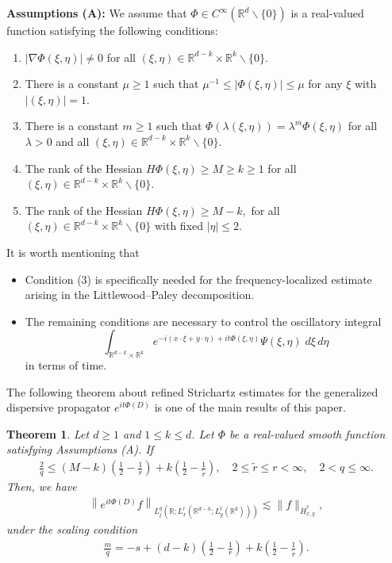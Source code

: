 \documentclass[a4paper,11pt, reqno]{amsart}
\newtheorem{theorem}{Theorem}[section]
\theoremstyle{definition}
\theoremstyle{remark}
\numberwithin{equation}{section}
\begin{document}
    \textbf{Assumptions (A):} We assume that $\Phi \in C^{\infty}\left(\mathbb{R}^{d} \backslash\{0\}\right)$ is a real-valued function satisfying the following conditions:
	\begin{enumerate}
		\item  $|\nabla \Phi(\xi, \eta)| \neq 0$ for all $(\xi, \eta) \in \mathbb{R}^{d-k} \times \mathbb{R}^{k} \backslash\{0\}$.
		\item  There is a constant $\mu \geq 1$ such that $\mu^{-1} \leq|\Phi(\xi, \eta)| \leq \mu$ for any $\xi$ with $|(\xi, \eta)|=1$.
		\item There is a constant $m \geq 1$ such that $\Phi(\lambda (\xi, \eta))=\lambda^m \Phi(\xi, \eta)$ for all $\lambda>0$ and all $(\xi, \eta) \in \mathbb{R}^{d-k} \times \mathbb{R}^{k} \backslash\{0\}$.
		\item The rank of the Hessian $H{\Phi}(\xi, \eta)\geq  M\geq k \geq 1$ for all $(\xi, \eta) \in \mathbb{R}^{d-k} \times \mathbb{R}^{k} \backslash\{0\}$.
		\item   The rank of the Hessian $H{\Phi}(\xi, \eta) \geq M-k,$ for all $(\xi, \eta) \in \mathbb{R}^{d-k} \times \mathbb{R}^{k} \backslash\{0\}$  with fixed $|\eta| \leq 2$.
	\end{enumerate}
It is worth mentioning that
\begin{itemize}
    \item Condition (3) is specifically needed for the frequency-localized estimate arising in the Littlewood–Paley decomposition.
  
    \item The remaining conditions are necessary to control the oscillatory integral $$ \int_{\mathbb{R}^{d-k} \times \mathbb{R}^k} e^{-i(x\cdot\xi+y\cdot \eta)+it\Phi(\xi, \eta)}\Psi(\xi, \eta) \;d\xi\, d\eta$$  in terms of time.
\end{itemize} 

  
    
    The following theorem about refined Strichartz estimates for the generalized dispersive propagator $e^{it \Phi(D)}$ is one of the main results of this paper. 
	\begin{theorem} \label{them1.1}
		Let $d \geq 1$ and $1 \leq k \leq d$. Let $\Phi$ be a real-valued smooth function satisfying Assumptions (A).  If
		\begin{align*} 
			\frac{2}{q} \leq(M-k)\left(\frac{1}{2}-\frac{1}{r}\right)+k\left(\frac{1}{2}-\frac{1}{\widetilde{r}}\right), \quad 2 \leq \widetilde{r} \leq r<\infty, \quad 2<q \leq \infty. 
		\end{align*}
		Then, we have
		\begin{align}\label{eq1inr}
			\left\|e^{i t\Phi(D)} f\right\|_{L_t^q\left(\mathbb{R} ; L_x^r\left(\mathbb{R}^{d-k} ; L_y^{\tilde{r}}\left(\mathbb{R}^k\right)\right)\right)} \lesssim\|f\|_{\dot{H}_{x, y}^s},
		\end{align}
		under the scaling condition
		\begin{align*} 
		\frac{{{m}}}{q}=-s +(d-k)\left(\frac{1}{2}-\frac{1}{r}\right)+k\left(\frac{1}{2}-\frac{1}{\widetilde{r}}\right).
		\end{align*}
		
	\end{theorem}   
\end{document}
